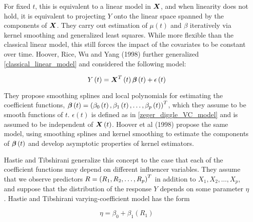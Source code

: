 \documentclass[12pt]{article}
\newcommand{\bfbeta}{\mbox{\boldmath $\beta$}}
\newcommand{\bfX}{\mbox{\boldmath $X$}}
\begin{document}
For fixed $t$, this is equivalent to a linear model in $\bfX$, and when linearity does not hold, it is equivalent to projecting $Y$ onto the linear space spanned by the components of $\bfX$. They carry out estimation of $\mu\left(t\right)$ and $\beta$ iteratively via kernel smoothing and generalized least squares. While more flexible than the classical linear model, this still forces the impact of the covariates to be constant over time.  Hoover, Rice, Wu and Yang (1998) further generalized \eqref{classical_linear_model} and considered the following model:

\begin{equation}
Y\left(t\right) =  \bfX^T\left(t\right)\bfbeta \left(t\right) + \epsilon\left(t\right) \label{hoover_rice_wu_VC_model}
\end{equation}

They propose smoothing splines and local polynomials for estimating the coefficient functions, $\bfbeta\left(t\right) = \left( \beta_0\left(t\right), \beta_1\left(t\right),\dots,\beta_p\left(t\right) \right)^T$, which they assume to be smooth functions of $t$. $\epsilon\left(t\right)$ is defined as in \eqref{zeger_diggle_VC_model} and is assumed to be independent of $\bfX\left(t\right)$. Hoover et al (1998) propose the same model, using smoothing splines and kernel smoothing to estimate  the components of $\bfbeta\left(t\right)$ and develop asymptotic properties of kernel estimators. 

Hastie and Tibshirani generalize this concept to the case that each of the coefficient functions may depend on different influencer variables. They assume that we observe predictors $\boldmath{R} = \left(R_1, R_2, \dots, R_p\right)^T$ in addition to $X_1, X_2, \dots, X_p$, and suppose that the distribution of the response $Y$ depends on some parameter $\eta$. Hastie and Tibshirani  varying-coefficient model has the form

\begin{equation}
\eta = \beta_0 + \beta_1\left(R_1\right) \label{hastie_tibshirani_VC_model}
\end{equation}
\end{document}
